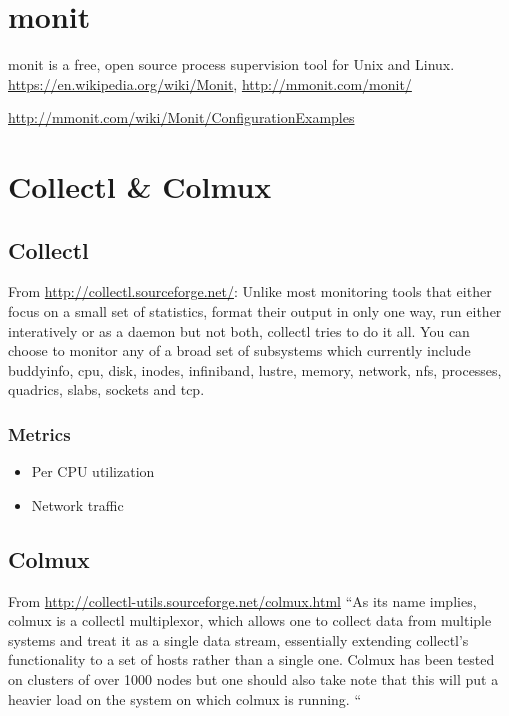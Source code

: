 \appendix

\section{monit}

monit is a free, open source process supervision tool for Unix and Linux. \url{https://en.wikipedia.org/wiki/Monit}, \url{http://mmonit.com/monit/}

\url{http://mmonit.com/wiki/Monit/ConfigurationExamples}


\section{Collectl \& Colmux}

\subsection{Collectl}

From \url{http://collectl.sourceforge.net/}:  Unlike most monitoring tools that either focus on a small set of statistics, format their output in only one way, run either interatively or as a daemon but not both, collectl tries to do it all. You can choose to monitor any of a broad set of subsystems which currently include buddyinfo, cpu, disk, inodes, infiniband, lustre, memory, network, nfs, processes, quadrics, slabs, sockets and tcp. 

\subsubsection{Metrics}

\begin{itemize}
 \item Per CPU utilization
 \item Network traffic
\end{itemize}

\subsection{Colmux}

From  \url{http://collectl-utils.sourceforge.net/colmux.html} ``As its name implies, colmux is a collectl multiplexor, which allows one to collect data from multiple systems and treat it as a single data stream, essentially extending collectl's functionality to a set of hosts rather than a single one. Colmux has been tested on clusters of over 1000 nodes but one should also take note that this will put a heavier load on the system on which colmux is running. ``

